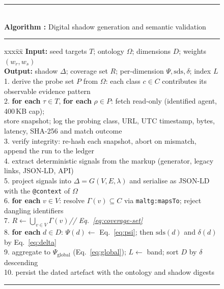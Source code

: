 \documentclass[engproc,proceedingpaper,submit,moreauthors]{Definitions/mdpi}
\newcounter{algo}
\renewcommand{\thealgo}{\arabic{algo}}
\begin{document}
\begin{figure}[H]
\centering
\begin{minipage}{\textwidth}
\footnotesize
{}\label{alg:sds}%
\rule{\textwidth}{0.6pt}\\[2pt]
\textbf{Algorithm \thealgo:} Digital shadow generation and semantic validation\\[-6pt]
\rule{\textwidth}{0.4pt}
\begin{tabbing}
xxx\=xx\=\kill
\textbf{Input:} seed targets $T$; ontology $\Omega$; dimensions $D$; weights $(w_r,w_s)$\\
\textbf{Output:} shadow $\Delta$; coverage set $R$; per-dimension $\Psi,\mathrm{sds},\delta$; index $L$\\[2pt]
1.\> derive the probe set $P$ from $\Omega$: each class $c\in C$ contributes its observable evidence pattern\\
2.\> \textbf{for each} $\tau\in T$, \textbf{for each} $\rho\in P$: fetch read-only (identified agent, 400\,KB cap);\\
\> store snapshot; log the probing class, URL, UTC timestamp, bytes, latency, SHA-256 and match outcome\\
3.\> verify integrity: re-hash each snapshot, abort on mismatch, append the run to the ledger\\
4.\> extract deterministic signals from the markup (generator, legacy links, JSON-LD, API)\\
5.\> project signals into $\Delta=G(V,E,\lambda)$ and serialise as JSON-LD with the \texttt{@context} of $\Omega$\\
6.\> \textbf{for each} $v\in V$: resolve $\Gamma(v)\subseteq C$ via \texttt{maltg:mapsTo}; reject dangling identifiers\\
7.\> $R \leftarrow \bigcup_{v\in V}\Gamma(v)$\hfill\textit{// Eq.~\eqref{eq:coverage-set}}\\
8.\> \textbf{for each} $d\in D$: $\Psi(d)\leftarrow$ Eq.~\eqref{eq:psi}; then $\mathrm{sds}(d)$ and $\delta(d)$ by Eq.~\eqref{eq:delta}\\
9.\> aggregate to $\Psi_{\mathrm{global}}$ (Eq.~\eqref{eq:global}); $L\leftarrow$ band; sort $D$ by $\delta$ descending\\
10.\> persist the dated artefact with the ontology and shadow digests
\end{tabbing}
\vspace{-6pt}\rule{\textwidth}{0.6pt}
\end{minipage}
\end{figure}
\end{document}
